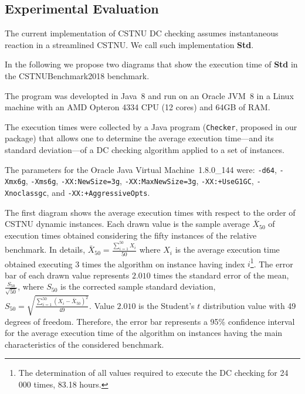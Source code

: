 \documentclass[a4paper,11pt]{article}
\begin{document}
  
\subsection{Experimental Evaluation}

The current implementation of CSTNU DC checking assumes instantaneous reaction in a streamlined CSTNU.
We call such implementation \textbf{Std}.

In the following we propose two diagrams that show the execution time of \textbf{Std} in the CSTNUBenchmark2018 benchmark.

The program was developted in Java~8 and run on an Oracle JVM~8 in a Linux machine with an AMD Opteron 4334 CPU (12 cores) and 64GB of RAM.

The execution times were collected by a Java program (\texttt{Checker}, proposed in our package) that allows one to determine the average execution time---and its standard deviation---of a DC checking algorithm
applied to a set of instances.

The parameters for the Oracle Java Virtual Machine~1.8.0\_144 were: \texttt{-d64}, \texttt{-Xmx6g}, \texttt{-Xms6g}, \texttt{-XX:NewSize=3g}, \texttt{-XX:MaxNewSize=3g}, \texttt{-XX:+UseG1GC}, \texttt{-Xnoclassgc}, and \texttt{-XX:+AggressiveOpts}. 

The first diagram shows the average execution times with respect to the order of CSTNU dynamic instances.
Each drawn value is the sample average $\bar{X}_{50}$ of execution times obtained considering the fifty instances of the relative benchmark. 
In details, $\bar{X}_{50}=\frac{\sum_{i=1}^{50} X_i}{50}$ where $X_i$ is the average execution time obtained executing 3 times the algorithm on instance having index $i$\footnote{The determination of all values required to execute the DC checking for 24 000 times, 83.18 hours.}.
The error bar of each drawn value represents $2.010$ times the standard error of the mean, $\frac{S_{50}}{\sqrt{50}}$, where $S_{50}$ is the corrected sample standard deviation, $S_{50}= \sqrt{\frac{\sum_{i=1}^{50} (X_i-\bar{X}_{50})^2}{49}}$. Value $2.010$ is the Student's $t$ distribution value with 49 degrees of freedom. 
Therefore, the error bar represents a 95\% confidence interval for the average execution time of the algorithm on instances having the main characteristics of the considered benchmark.
\end{document}
